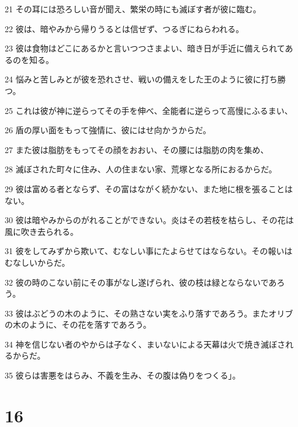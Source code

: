 \par 21 その耳には恐ろしい音が聞え、繁栄の時にも滅ぼす者が彼に臨む。
\par 22 彼は、暗やみから帰りうるとは信ぜず、つるぎにねらわれる。
\par 23 彼は食物はどこにあるかと言いつつさまよい、暗き日が手近に備えられてあるのを知る。
\par 24 悩みと苦しみとが彼を恐れさせ、戦いの備えをした王のように彼に打ち勝つ。
\par 25 これは彼が神に逆らってその手を伸べ、全能者に逆らって高慢にふるまい、
\par 26 盾の厚い面をもって強情に、彼にはせ向かうからだ。
\par 27 また彼は脂肪をもってその顔をおおい、その腰には脂肪の肉を集め、
\par 28 滅ぼされた町々に住み、人の住まない家、荒塚となる所におるからだ。
\par 29 彼は富める者とならず、その富はながく続かない、また地に根を張ることはない。
\par 30 彼は暗やみからのがれることができない。炎はその若枝を枯らし、その花は風に吹き去られる。
\par 31 彼をしてみずから欺いて、むなしい事にたよらせてはならない。その報いはむなしいからだ。
\par 32 彼の時のこない前にその事がなし遂げられ、彼の枝は緑とならないであろう。
\par 33 彼はぶどうの木のように、その熟さない実をふり落すであろう。またオリブの木のように、その花を落すであろう。
\par 34 神を信じない者のやからは子なく、まいないによる天幕は火で焼き滅ぼされるからだ。
\par 35 彼らは害悪をはらみ、不義を生み、その腹は偽りをつくる」。

\chapter{16}

